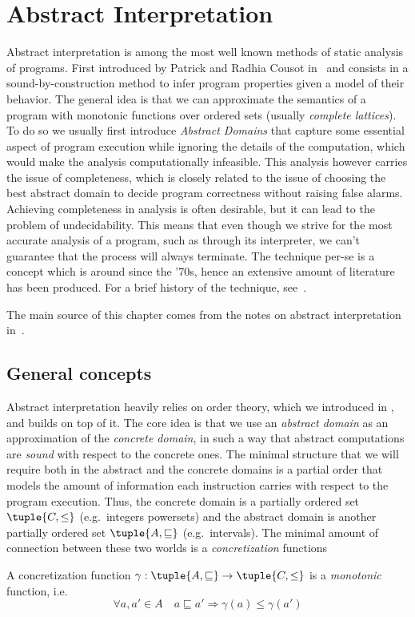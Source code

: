 \section{Abstract Interpretation}\label{sec:abstrint}

Abstract interpretation is among the most well known methods of static
analysis of programs. First introduced by Patrick and Radhia Cousot
in~\cite{patrickradhia:one, patrickradhia:two} and consists in a
sound-by-construction method to infer program properties given a model
of their behavior. The general idea is that we can approximate the
semantics of a program with monotonic functions over ordered sets
(usually \emph{complete lattices}). To do so we usually first
introduce \emph{Abstract Domains} that capture some essential aspect
of program execution while ignoring the details of the computation,
which would make the analysis computationally infeasible.  This
analysis however carries the issue of completeness, which is closely
related to the issue of choosing the best abstract domain to decide
program correctness without raising false alarms. Achieving
completeness in analysis is often desirable, but it can lead to the
problem of undecidability. This means that even though we strive for
the most accurate analysis of a program, such as through its
interpreter, we can't guarantee that the process will always
terminate.  The technique per-se is a concept which is around since
the '70s, hence an extensive amount of literature has been
produced. For a brief history of the technique,
see~\cite{ranzato:history}.

The main source of this chapter comes from the notes on abstract
interpretation in~\cite{mine:course}.

\subsection{General concepts}\label{subsec:abstrgeneral}

Abstract interpretation heavily relies on order theory, which we
introduced in , and builds on top of
it. The core idea is that we use an \emph{abstract domain} as an
approximation of the \emph{concrete domain}, in such a way that
abstract computations are \emph{sound} with respect to the concrete
ones. The minimal structure that we will require both in the abstract
and the concrete domains is a partial order that models the amount of
information each instruction carries with respect to the program
execution. Thus, the concrete domain is a partially ordered set
\(\tuple{C, \leq}\) (e.g.\ integers powersets) and the abstract domain
is another partially ordered set \(\tuple{A, \sqsubseteq}\) (e.g.\
intervals). The minimal amount of connection between these two worlds
is a \emph{concretization} functions
\begin{definition}[Concretization]
  A concretization function
  \(\gamma : \tuple{A , \sqsubseteq} \to \tuple{C, \leq}\) is a
  \emph{monotonic} function, i.e.
  \begin{equation*}
    \forall a,a' \in A \quad a \sqsubseteq a' \Rightarrow \gamma(a) \leq \gamma(a')
  \end{equation*}
\end{definition}

